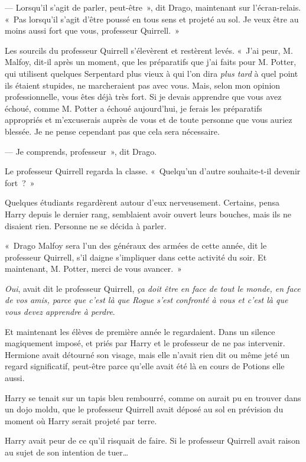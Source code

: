 --- Lorsqu'il s'agit de parler, peut-être~», dit Drago, maintenant sur l'écran-relais. «~Pas lorsqu'il s'agit d'être poussé en tous sens et projeté au sol. Je veux être au moins aussi fort que vous, professeur Quirrell.~»

Les sourcils du professeur Quirrell s'élevèrent et restèrent levés. «~J'ai peur, M. Malfoy, dit-il après un moment, que les préparatifs que j'ai faits pour M. Potter, qui utilisent quelques Serpentard plus vieux à qui l'on dira \emph{plus tard} à quel point ils étaient stupides, ne marcheraient pas avec vous. Mais, selon mon opinion professionnelle, vous êtes déjà très fort. Si je devais apprendre que vous avez échoué, comme M. Potter a échoué aujourd'hui, je ferais les préparatifs appropriés et m'excuserais auprès de vous et de toute personne que vous auriez blessée. Je ne pense cependant pas que cela sera nécessaire.

--- Je comprends, professeur~», dit Drago.

Le professeur Quirrell regarda la classe. «~Quelqu'un d'autre souhaite-t-il devenir fort~?~»

Quelques étudiants regardèrent autour d'eux nerveusement. Certains, pensa Harry depuis le dernier rang, semblaient avoir ouvert leurs bouches, mais ils ne disaient rien. Personne ne se décida à parler.

«~Drago Malfoy sera l'un des généraux des armées de cette année, dit le professeur Quirrell, s'il daigne s'impliquer dans cette activité du soir. Et maintenant, M. Potter, merci de vous avancer.~»

\later

\emph{Oui}, avait dit le professeur Quirrell, \emph{ça doit être en face de tout le monde, en face de vos amis, parce que c'est là que Rogue s'est confronté à vous et c'est là que vous devez apprendre à perdre}.

Et maintenant les élèves de première année le regardaient. Dans un silence magiquement imposé, et priés par Harry et le professeur de ne pas intervenir. Hermione avait détourné son visage, mais elle n'avait rien dit ou même jeté un regard significatif, peut-être parce qu'elle avait été là en cours de Potions elle aussi.

Harry se tenait sur un tapis bleu rembourré, comme on aurait pu en trouver dans un dojo moldu, que le professeur Quirrell avait déposé au sol en prévision du moment où Harry serait projeté par terre.

Harry avait peur de ce qu'il risquait de faire. Si le professeur Quirrell avait raison au sujet de son intention de tuer…

